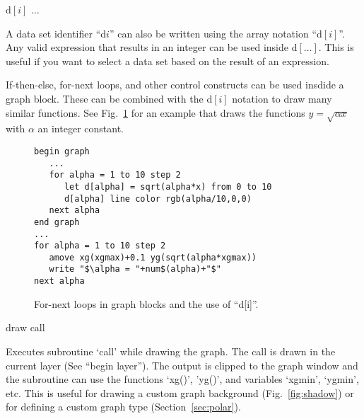 \begin{commanddescription}
% 
% 

\item[{\sf d$\left[i\right]$ $\ldots$}]

A data set identifier ``d$i$'' can also be written using the array notation ``d$\left[i\right]$''. Any valid expression that results in an integer can be used inside d$\left[\ldots\right]$. This is useful if you want to select a data set based on the result of an expression.

If-then-else, for-next loops, and other control constructs can be used insdide a graph block. These can be combined with the d$\left[i\right]$ notation to draw many similar functions. See Fig.~\ref{fig:sqroot} for an example that draws the functions $y = \sqrt{\alpha x}$ with $\alpha$ an integer constant.

\begin{figure}[tb]
\begin{minipage}[c]{9.2cm}
\begin{Verbatim}
begin graph
   ...
   for alpha = 1 to 10 step 2
      let d[alpha] = sqrt(alpha*x) from 0 to 10
      d[alpha] line color rgb(alpha/10,0,0)
   next alpha
end graph
...
for alpha = 1 to 10 step 2
   amove xg(xgmax)+0.1 yg(sqrt(alpha*xgmax))
   write "$\alpha = "+num$(alpha)+"$"
next alpha
\end{Verbatim}
\end{minipage}
\hfill
\begin{minipage}[c]{7cm}
\mbox{}
\end{minipage}
\caption{\label{fig:sqroot}For-next loops in graph blocks and the use of ``d[i]''.}
\end{figure}

\item[{\sf draw call}]
\label{cmd:draw}

Executes subroutine `call' while drawing the graph. The call is drawn in the current layer (See ``begin layer''). The output is clipped to the graph window and the subroutine can use the functions `xg()', 'yg()', and variables `xgmin', `ygmin', etc. This is useful for drawing a custom graph background (Fig.~\ref{fig:shadow}) or for defining a custom graph type (Section~\ref{sec:polar}).


\end{commanddescription}
